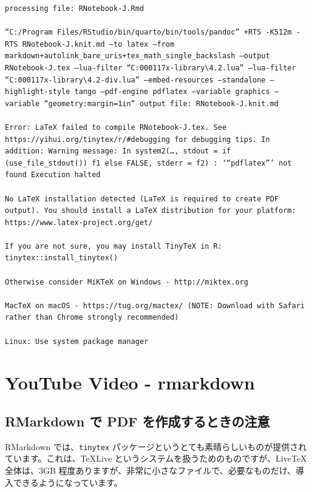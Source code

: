 \documentclass[
  xelatex, ja=standard]{bxjsbook}
\theoremstyle{definition}
\theoremstyle{definition}
\theoremstyle{definition}
\theoremstyle{definition}
\theoremstyle{remark}
\begin{document}
\begin{verbatim}
processing file: RNotebook-J.Rmd

“C:/Program Files/RStudio/bin/quarto/bin/tools/pandoc” +RTS -K512m -RTS RNotebook-J.knit.md –to latex –from markdown+autolink_bare_uris+tex_math_single_backslash –output RNotebook-J.tex –lua-filter “C:000117x-library\4.2.lua” –lua-filter “C:000117x-library\4.2-div.lua” –embed-resources –standalone –highlight-style tango –pdf-engine pdflatex –variable graphics –variable “geometry:margin=1in” output file: RNotebook-J.knit.md

Error: LaTeX failed to compile RNotebook-J.tex. See https://yihui.org/tinytex/r/#debugging for debugging tips. In addition: Warning message: In system2(…, stdout = if (use_file_stdout()) f1 else FALSE, stderr = f2) : ‘“pdflatex”’ not found Execution halted

No LaTeX installation detected (LaTeX is required to create PDF output). You should install a LaTeX distribution for your platform: https://www.latex-project.org/get/

If you are not sure, you may install TinyTeX in R: tinytex::install_tinytex()

Otherwise consider MiKTeX on Windows - http://miktex.org

MacTeX on macOS - https://tug.org/mactex/ (NOTE: Download with Safari rather than Chrome strongly recommended)

Linux: Use system package manager
\end{verbatim}

\hypertarget{youtube-video---rmarkdown}{%
\section{YouTube Video - rmarkdown}\label{youtube-video---rmarkdown}}

\hypertarget{rmarkdown-ux3067-pdf-ux3092ux4f5cux6210ux3059ux308bux3068ux304dux306eux6ce8ux610f}{%
\subsection{RMarkdown で PDF を作成するときの注意}\label{rmarkdown-ux3067-pdf-ux3092ux4f5cux6210ux3059ux308bux3068ux304dux306eux6ce8ux610f}}

RMarkdown では、\texttt{tinytex} パッケージというとても素晴らしいものが提供されています。これは、TeXLive というシステムを扱うためのものですが、LiveTeX 全体は、3GB 程度ありますが、非常に小さなファイルで、必要なものだけ、導入できるようになっています。
\end{document}
